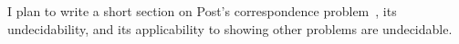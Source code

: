 \label{sec:postcorrespondenceproblem}

\begin{construction}
I plan to write a short section on Post's correspondence problem~\citeyearpar{Post1946RecursivelyUnsolvableProblem}, its undecidability, and its applicability to showing other problems are undecidable.
\end{construction}